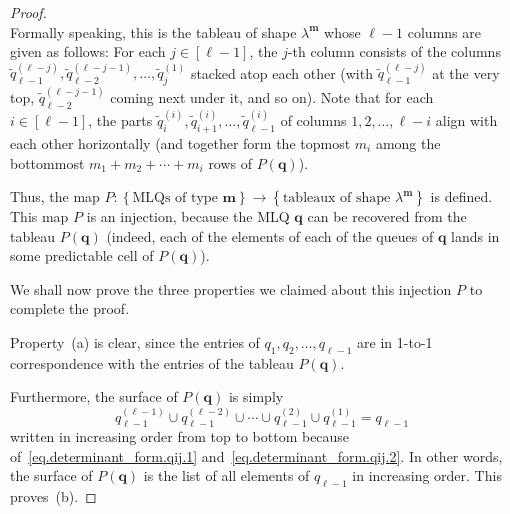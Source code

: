 \documentclass[reqno]{amsart}
\newcommand{\0}{\phantom{c}}
\newcommand{\mm}{\mathbf{m}}
\newcommand{\qq}{\mathbf{q}}
\newcommand{\set}[1]{\left\{ #1 \right\}}
\newcommand{\ive}[1]{\left[ #1 \right]}
\theoremstyle{plain}
\theoremstyle{definition}
\numberwithin{equation}{section}
\begin{document}
\begin{proof}
\begin{equation}
\end{equation}
Formally speaking, this is the tableau of shape $\lambda^{\mm}$ whose $\ell-1$ columns are given as follows:
For each $j \in \ive{\ell-1}$, the $j$-th column consists of the columns $\widetilde{q}_{\ell-1}^{(\ell-j)}, \widetilde{q}_{\ell-2}^{(\ell-j-1)}, \dotsc, \widetilde{q}_j^{(1)}$ stacked atop each other (with $\widetilde{q}_{\ell-1}^{(\ell-j)}$ at the very top, $\widetilde{q}_{\ell-2}^{(\ell-j-1)}$ coming next under it, and so on).
Note that for each $i \in \ive{\ell-1}$, the parts $\widetilde{q}_i^{(i)}, \widetilde{q}_{i+1}^{(i)}, \dotsc, \widetilde{q}_{\ell-1}^{(i)}$ of columns $1,2,\ldots,\ell-i$ align with each other horizontally (and together form the topmost $m_i$ among the bottommost $m_1+m_2+\cdots+m_i$ rows of $P(\qq)$).

Thus, the map $P \colon \set{ \text{MLQs of type } \mm } \to \set{\text{tableaux of shape } \lambda^{\mm}}$ is defined.
This map $P$ is an injection, because the MLQ $\qq$ can be recovered
from the tableau $P(\qq)$ (indeed, each of the elements
of each of the queues of $\qq$ lands in some predictable cell of
$P(\qq)$).

We shall now prove the three properties we claimed about this injection $P$ to complete the proof.

Property~(a) is clear, since the entries of $q_1, q_2, \dotsc, q_{\ell-1}$ are in 1-to-1 correspondence with the entries of the tableau $P(\qq)$.

Furthermore, the surface of $P(\qq)$ is simply
\[
q_{\ell-1}^{(\ell-1)} \cup q_{\ell-1}^{(\ell-2)} \cup \cdots \cup q_{\ell-1}^{(2)} \cup q_{\ell-1}^{(1)} = q_{\ell-1}
\]
written in increasing order from top to bottom because of~\eqref{eq.determinant_form.qij.1} and~\eqref{eq.determinant_form.qij.2}.
In other words, the surface of $P(\qq)$ is the list of all elements of $q_{\ell-1}$ in increasing order.
This proves~(b).


\end{proof}
\end{document}
